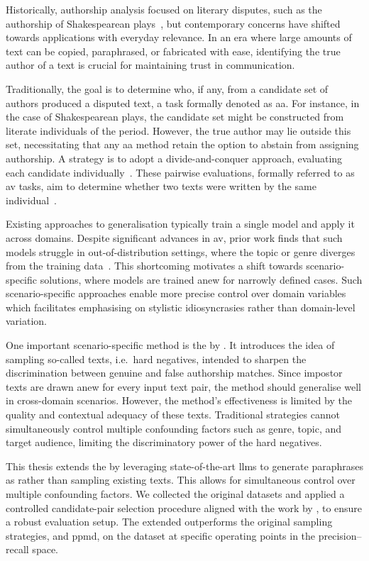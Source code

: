 Historically, authorship analysis focused on literary disputes, such as the authorship of Shakespearean plays~\citep{neal_surveying_2018,stamatatos_survey_2009}, but contemporary concerns have shifted towards applications with everyday relevance.
In an era where large amounts of text can be copied, paraphrased, or fabricated with ease, identifying the true author of a text is crucial for maintaining trust in communication. 

Traditionally, the goal is to determine who, if any, from a candidate set of authors produced a disputed text, a task formally denoted as \ac{aa}. 
For instance, in the case of Shakespearean plays, the candidate set might be constructed from literate individuals of the period.
However, the true author may lie outside this set, necessitating that any \ac{aa} method retain the option to abstain from assigning authorship. 
A strategy is to adopt a divide-and-conquer approach, evaluating each candidate individually~\citep{tyo_state_2022,barlas_cross_domain_2020}. 
These pairwise evaluations, formally referred to as \ac{av} tasks, aim to determine whether two texts were written by the same individual~\citep{koppel_authorship_2004}. 

Existing approaches to generalisation typically train a single model and apply it across domains.
Despite significant advances in \ac{av}, prior work finds that such models struggle in out-of-distribution settings, where the topic or genre diverges from the training data~\citep{Sundararajan_style_18,bischoff_importance_2020,li_learning_2025}. 
This shortcoming motivates a shift towards scenario-specific solutions, where models are trained anew for narrowly defined cases. 
Such scenario-specific approaches enable more precise control over domain variables which facilitates emphasising on stylistic idiosyncrasies rather than domain-level variation.

One important scenario-specific method is the \impAppr{} by \citet{koppel_determining_2014}.
It introduces the idea of sampling so-called \imp{} texts, i.e.\ hard negatives, intended to sharpen the discrimination between genuine and false authorship matches. 
Since impostor texts are drawn anew for every input text pair, the method should generalise well in cross-domain scenarios.
However, the method's effectiveness is limited by the quality and contextual adequacy of these \imp{} texts. 
Traditional strategies cannot simultaneously control multiple confounding factors such as genre, topic, and target audience, limiting the discriminatory power of the hard negatives.

This thesis extends the \impAppr{} by leveraging state-of-the-art \acp{llm} to generate paraphrases as \imps{} rather than sampling existing texts.
This allows for simultaneous control over multiple confounding factors.
We collected the original datasets and applied a controlled candidate-pair selection procedure aligned with the work by \citet{koppel_determining_2014}, to ensure a robust evaluation setup.
The extended \impAppr{} outperforms the original sampling strategies, \unmasking{} and \acs{ppmd}, on the \dataStudent{} dataset at specific operating points in the precision–recall space.

